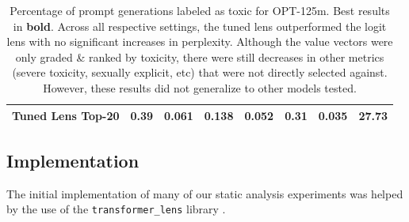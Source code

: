 \documentclass{article}
\theoremstyle{plain}
\theoremstyle{definition}
\begin{document}
\begin{table}[t]
\begin{tabular}{l|lllllll}
Tuned Lens Top-20 & \textbf{0.39}     & \textbf{0.061}                                                     & \textbf{0.138}                                                       & \textbf{0.052}  & \textbf{0.31}      & 0.035                                                     & 27.73      \\ \hline
\end{tabular}
\caption{Percentage of prompt generations labeled as toxic for OPT-125m. Best results in \textbf{bold}. Across all respective settings, the tuned lens outperformed the logit lens with no significant increases in perplexity. Although the value vectors were only graded \& ranked by toxicity, there were still decreases in other metrics (severe toxicity, sexually explicit, etc) that were not directly selected against. However, these results did not generalize to other models tested.}
\label{table:toxicity-scores}
\end{table}

\subsection{Implementation}

 The initial implementation of many of our static analysis experiments was helped by the use of the \texttt{transformer\_lens} library \citep{nandatransformerlens2022}.

\end{document}
